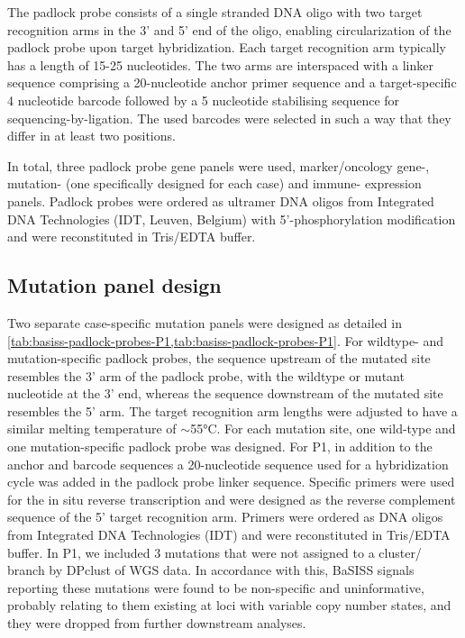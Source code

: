 The padlock probe consists of a single stranded DNA oligo with two target recognition arms in the 3' and 5' end of the oligo, enabling circularization of the padlock probe upon target hybridization. Each target recognition arm typically has a length of 15-25 nucleotides. The two arms are interspaced with a linker sequence comprising a 20-nucleotide anchor primer sequence and a target-specific 4 nucleotide barcode followed by a 5 nucleotide stabilising sequence for sequencing-by-ligation. The used barcodes were selected in such a way that they differ in at least two positions.

In total, three padlock probe gene panels were used, marker/oncology gene-, mutation- (one specifically designed for each case) and immune- expression panels. Padlock probes were ordered as ultramer DNA oligos from Integrated DNA Technologies (IDT, Leuven, Belgium) with 5'-phosphorylation modification and were reconstituted in Tris/EDTA buffer.

\subsection{Mutation panel design}

Two separate case-specific mutation panels were designed as detailed in \cref{tab:basiss-padlock-probes-P1,tab:basiss-padlock-probes-P1}. For wildtype- and mutation-specific padlock probes, the sequence upstream of the mutated site resembles the 3' arm of the padlock probe, with the wildtype or mutant nucleotide at the 3' end, whereas the sequence downstream of the mutated site resembles the 5' arm. The target recognition arm lengths were adjusted to have a similar melting temperature of $\sim$55°C. For each mutation site, one wild-type and one mutation-specific padlock probe was designed. For P1, in addition to the anchor and barcode sequences a 20-nucleotide sequence used for a hybridization cycle was added in the padlock probe linker sequence. Specific primers were used for the in situ reverse transcription and were designed as the reverse complement sequence of the 5’ target recognition arm. Primers were ordered as DNA oligos from Integrated DNA Technologies (IDT) and were reconstituted in Tris/EDTA buffer. In P1, we included 3 mutations that were not assigned to a cluster/ branch by DPclust of WGS data. In accordance with this, \ac{BaSISS} signals reporting these mutations were found to be non-specific and uninformative, probably relating to them existing at loci with variable copy number states, and they were dropped from further downstream analyses. 

